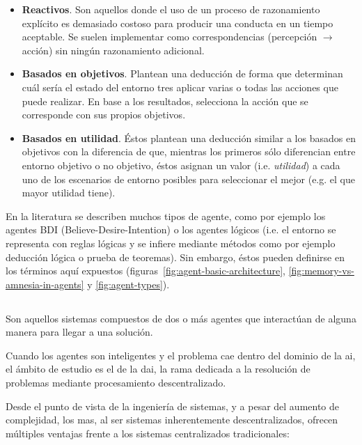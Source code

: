 \begin{itemize}
	\item \textbf{Reactivos}. Son aquellos donde el uso de un proceso de razonamiento explícito es demasiado costoso para producir una conducta en un tiempo aceptable. Se suelen implementar como correspondencias (percepción $\rightarrow$ acción) sin ningún razonamiento adicional.
	\item \textbf{Basados en objetivos}. Plantean una deducción de forma que determinan cuál sería el estado del entorno tres aplicar varias o todas las acciones que puede realizar. En base a los resultados, selecciona la acción que se corresponde con sus propios objetivos.
	\item \textbf{Basados en utilidad}. Éstos plantean una deducción similar a los basados en objetivos con la diferencia de que, mientras los primeros sólo diferencian entre entorno objetivo o no objetivo, éstos asignan un valor (i.e. \textit{utilidad}) a cada uno de los escenarios de entorno posibles para seleccionar el mejor (e.g. el que mayor utilidad tiene).
\end{itemize}

En la literatura se describen muchos tipos de agente, como por ejemplo los agentes BDI (Believe-Desire-Intention) o los agentes lógicos (i.e. el entorno se representa con reglas lógicas y se infiere mediante métodos como por ejemplo deducción lógica o prueba de teoremas). Sin embargo, éstos pueden definirse en los términos aquí expuestos (figuras~\ref{fig:agent-basic-architecture}, \ref{fig:memory-vs-amnesia-in-agents} y \ref{fig:agent-types}). 

\subsection{}

Son aquellos sistemas compuestos de dos o más agentes que interactúan de alguna manera para llegar a una solución.

Cuando los agentes son inteligentes y el problema cae dentro del dominio de la \gls{ai}, el ámbito de estudio es el de la \gls{dai}, la rama dedicada a la resolución de problemas mediante procesamiento descentralizado.

Desde el punto de vista de la ingeniería de sistemas, y a pesar del aumento de complejidad, los \ac{mas}, al ser sistemas inherentemente descentralizados, ofrecen múltiples ventajas frente a los sistemas centralizados tradicionales:

